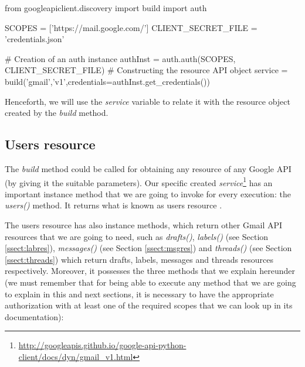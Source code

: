 \begin{python}
	from googleapiclient.discovery import build
	import auth
	
	SCOPES = ['https://mail.google.com/']
	CLIENT_SECRET_FILE = 'credentials.json'
	
	# Creation of an auth instance
	authInst = auth.auth(SCOPES, CLIENT_SECRET_FILE)
	# Constructing the resource API object
	service = build('gmail','v1',credentials=authInst.get_credentials())
\end{python}

Henceforth, we will use the \textit{service} variable to relate it with the resource object created by the \textit{build} method.

\subsection{Users resource}\label{ssect:userres}
The \textit{build} method could be called for obtaining any resource of any Google API (by giving it the suitable parameters). Our specific created \textit{service}\footnote{\url{http://googleapis.github.io/google-api-python-client/docs/dyn/gmail\_v1.html}} has an important instance method that we are going to invoke for every execution: the \textit{users()} method. It returns what is known as users resource \citep[/v1/reference/users]{gmailAPI}.

The users resource has also instance methods, which return other Gmail API resources that we are going to need, such as \textit{drafts()}, \textit{labels()} (see Section \ref{ssect:labres}), \textit{messages()} (see Section \ref{ssect:msgres}) and \textit{threads()} (see Section \ref{ssect:threads}) which return drafts, labels, messages and threads resources respectively. Moreover, it possesses the three methods that we explain hereunder (we must remember that for being able to execute any method that we are going to explain in this and next sections, it is necessary to have the appropriate authorization with at least one of the required scopes that we can look up in its documentation):

